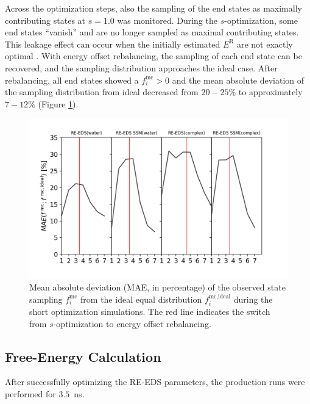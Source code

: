 Across the optimization steps, also the sampling of the end states as maximally contributing states at $s=1.0$ was monitored.
During the $s$-optimization, some end states ``vanish'' and are no longer sampled as maximal contributing states. This leakage effect can occur when the initially estimated $E^{\text{R}}$ are not exactly optimal \cite{Sidler2016}. 
With energy offset rebalancing, the sampling of each end state can be recovered, and the sampling distribution approaches the ideal case.
After rebalancing, all end states showed a $f_i^{\text{mc}} > 0$ and the mean absolute deviation of the sampling distribution from ideal decreased from $20-25\%$ to approximately $7-12\%$ (Figure \ref{SIfig:CHK1_RingOpening_optimization_fractOptSampMAE}). 
 


\begin{figure}[h]
\centering
\includegraphics[width=\linewidth]{fig/results/ringOpening/paramOptimization/RingOpening_optimization_fractOptSampMAE.png}
\caption{Mean absolute deviation (MAE, in percentage) of the observed state sampling $f_i^{\text{mc}}$ from the ideal equal distribution $f_i^{\text{mc,ideal}}$ during the short optimization simulations. The red line indicates the switch from $s$-optimization to energy offset rebalancing.}
\label{SIfig:CHK1_RingOpening_optimization_fractOptSampMAE}
\end{figure}

\FloatBarrier
\clearpage

\subsection{Free-Energy Calculation}
After successfully optimizing the RE-EDS parameters, the production runs were performed for $3.5$~ns. 


